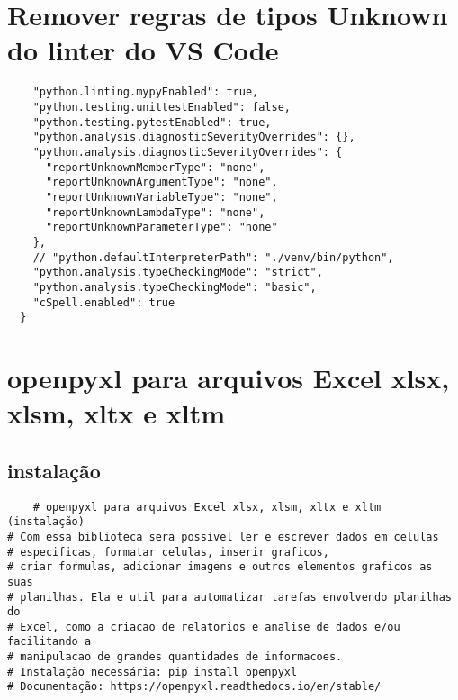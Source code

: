 \documentclass{article}
\begin{document}
\section{Remover regras de tipos Unknown do linter do VS Code}
\begin{lstlisting}
    "python.linting.mypyEnabled": true,
    "python.testing.unittestEnabled": false,
    "python.testing.pytestEnabled": true,
    "python.analysis.diagnosticSeverityOverrides": {},
    "python.analysis.diagnosticSeverityOverrides": {
      "reportUnknownMemberType": "none",
      "reportUnknownArgumentType": "none",
      "reportUnknownVariableType": "none",
      "reportUnknownLambdaType": "none",
      "reportUnknownParameterType": "none"
    },
    // "python.defaultInterpreterPath": "./venv/bin/python",
    "python.analysis.typeCheckingMode": "strict",
    "python.analysis.typeCheckingMode": "basic",
    "cSpell.enabled": true
  }
\end{lstlisting}

\section{openpyxl para arquivos Excel xlsx, xlsm, xltx e xltm}
\subsection{instalação}
\begin{lstlisting}
    # openpyxl para arquivos Excel xlsx, xlsm, xltx e xltm (instalação)
# Com essa biblioteca sera possivel ler e escrever dados em celulas
# especificas, formatar celulas, inserir graficos,
# criar formulas, adicionar imagens e outros elementos graficos as suas
# planilhas. Ela e util para automatizar tarefas envolvendo planilhas do
# Excel, como a criacao de relatorios e analise de dados e/ou facilitando a
# manipulacao de grandes quantidades de informacoes.
# Instalação necessária: pip install openpyxl
# Documentação: https://openpyxl.readthedocs.io/en/stable/

\end{lstlisting}
\end{document}

